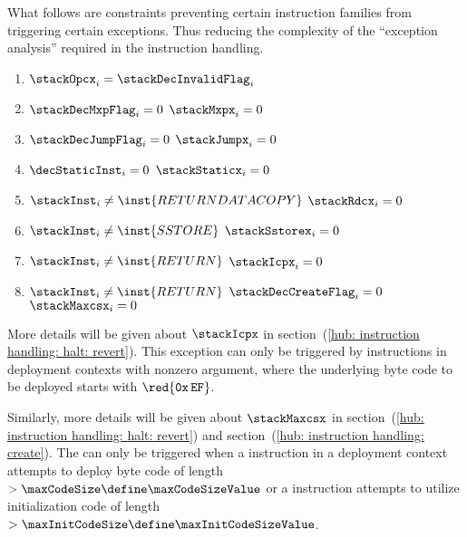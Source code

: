 \begin{center}
\end{center}
What follows are constraints preventing certain instruction families from triggering certain exceptions.
Thus reducing the complexity of the ``exception analysis'' required in the instruction handling.
\begin{enumerate}
	\item $\stackOpcx _{i} = \stackDecInvalidFlag _{i}$
	\item \If $\stackDecMxpFlag  _{i} =    0                     $ \Then $\stackMxpx          _{i} = 0$
	\item \If $\stackDecJumpFlag _{i} =    0                     $ \Then $\stackJumpx         _{i} = 0$
	\item \If $\decStaticInst    _{i} =    0                     $ \Then $\stackStaticx       _{i} = 0$
	\item \If $\stackInst        _{i} \neq \inst{RETURNDATACOPY} $ \Then $\stackRdcx          _{i} = 0$
	\item \If $\stackInst        _{i} \neq \inst{SSTORE}         $ \Then $\stackSstorex       _{i} = 0$
	\item \If $\stackInst        _{i} \neq \inst{RETURN}         $ \Then $\stackIcpx          _{i} = 0$
	\item \If $\stackInst        _{i} \neq \inst{RETURN}         $ \et   $\stackDecCreateFlag _{i} = 0$ \Then $\stackMaxcsx _{i} = 0$
\end{enumerate}
\saNote{}
More details will be given about $\stackIcpx$ in section~(\ref{hub: instruction handling: halt: revert}).
This exception can only be triggered by  instructions in deployment contexts with nonzero  argument,
where the underlying byte code to be deployed starts with
$\red{\texttt{0x\,EF}}$.

\saNote{}
Similarly, more details will be given about $\stackMaxcsx$ in
section~(\ref{hub: instruction handling: halt: revert}) and
section~(\ref{hub: instruction handling: create}).
The \maxcsxSH{} can only be triggered when
a     instruction in a deployment context attempts to deploy byte code of length $> \maxCodeSize     \define \maxCodeSizeValue$ or
a  instruction attempts to utilize initialization code of length              $> \maxInitCodeSize \define \maxInitCodeSizeValue$.
